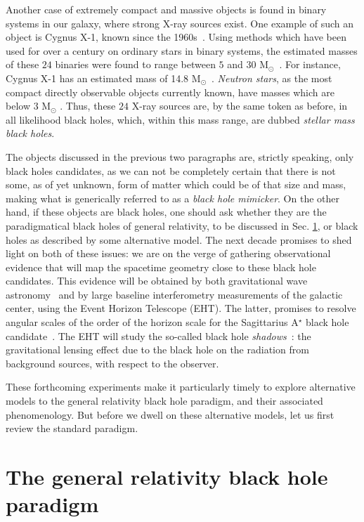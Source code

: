 Another case of extremely compact and massive objects is found in binary systems in our galaxy, where strong X-ray sources exist.
One example of such an object is Cygnus X-1, known since the 1960s~\cite{1965Sci...147..394B}.
Using methods which have been used for over a century on ordinary stars in binary systems, the estimated masses of these $24$ binaries were found to range between $5$ and $30$ M$_\odot$~\cite{Narayan:2013gca}.
For instance, Cygnus X-1 has an estimated mass of 14.8 M$_\odot$~\cite{Reid:2011nn}.
\textit{Neutron stars}, as the most compact directly observable objects currently known, have masses which are below $3$ M$_\odot$ \cite{Kalogera:1996ci,Rhoades:1974fn}.
Thus, these $24$ X-ray sources are, by the same token as before, in all likelihood black holes, which, within this mass range, are dubbed \textit{stellar mass black holes}.

The objects discussed in the previous two paragraphs are, strictly speaking, only black holes candidates, as we can not be completely certain that there is not some, as of yet unknown, form of matter which could be of that size and mass, making what is generically referred to as a \textit{black hole mimicker}.
On the other hand, if these objects are black holes, one should ask whether they are the paradigmatical black holes of general relativity, to be discussed in Sec. \ref{sec:bh_gr}, or black holes as described by some alternative model.
The next decade promises to shed light on both of these issues: we are on the verge of gathering observational evidence that will map the spacetime geometry close to these black hole candidates.
This evidence will be obtained by both gravitational wave astronomy~\cite{Hild:2011np,Hobbs:2009yy,Seoane:2013qna} and by large baseline interferometry measurements of the galactic center, using the Event Horizon Telescope (EHT).
The latter, promises to resolve angular scales of the order of the horizon scale for the Sagittarius A$^\star$ black hole candidate~\cite{Loeb:2013lfa}.
The EHT will study the so-called black hole \textit{shadows}~\cite{Falcke:1999pj}: the gravitational lensing effect due to the black hole on the radiation from background sources, with respect to the observer.

These forthcoming experiments make it particularly timely to explore alternative models to the general relativity black hole paradigm, and their associated phenomenology.
But before we dwell on these alternative models, let us first review the standard paradigm.
\section{The general relativity black hole paradigm}
\label{sec:bh_gr}

